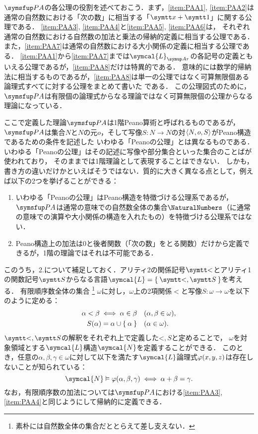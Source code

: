 \(\PA\)の各公理の役割を述べておこう．まず，\cref{item:PAA1}, \cref{item:PAA2}は通常の自然数における「次の数」に相当する「\(\obj{x} + \obj{1}\)」に関する公理である．
\cref{item:PAA3}, \cref{item:PAA4}と\cref{item:PAA5}, \cref{item:PAA6}は，
それぞれ通常の自然数における自然数の加法と乗法の帰納的定義に相当する公理である．
また，\cref{item:PAA7}は通常の自然数における大小関係の定義に相当する公理である．
\cref{item:PAA1}から\cref{item:PAA7}までは\(\symcal{L}_{\Ar}\)の各記号の定義ともいえる公理であるが，\cref{item:PAA8}だけは特異的である．
意味的には数学的帰納法に相当するものであるが，\cref{item:PAA8}は単一の公理ではなく可算無限個ある論理式すべてに対する公理をまとめて書いた%
%
である．
この公理図式のために，\(\PA\)は有限個の論理式からなる理論ではなく可算無限個の公理からなる理論になっている．

\begin{Note}
	ここで定義した理論\(\PA\)は1階Peano算術と呼ばれるものであるが，
	\(\PA\)は集合\(N\)と\(N\)の元\(o\)，そして写像\(S \colon N \to N\)の対\(\langle N, o, S \rangle\)がPeano構造であるための条件を記述した
	いわゆる「Peanoの公理」とは異なるものである．
	いわゆる「Peanoの公理」はその記述に写像や部分集合といった集合のことばが使われており，
	そのままでは1階理論として表現することはできない．
	しかも，書き方の違いだけかといえばそうではない．質的に大きく異なる点として，例えば以下の2つを挙げることができる：
	\begin{enumerate}
		\item いわゆる「Peanoの公理」はPeano構造を特徴づける公理系であるが，
		      \(\PA\)は通常の意味での自然数全体の集合\(\NaturalNumbers\)（に通常の意味での演算や大小関係の構造を入れたもの）を特徴づける公理系ではない．
		\item Peano構造上の加法は0と後者関数（「次の数」をとる関数）だけから定義できるが，1階の理論ではそれは不可能である．
	\end{enumerate}

	このうち，2.について補足しておく．アリティ2の関係記号\(\obj{<}\)とアリティ1の関数記号\(\obj{S}\)からなる言語\(\symcal{L} = \Set{\obj{<}, \obj{S}}\)を考える．
	有限順序数全体の集合%
	\footnote{%
		素朴には自然数全体の集合だととらえて差し支えない．%
	}%
	\(\omega\)に対し，\(\omega\)上の2項関係\(<\)と写像\(S \colon \omega \to \omega\)を以下のように定める：
	\begin{align*}
		\alpha < \beta \metaequivalent \alpha \in \beta \quad & (\alpha, \beta \in \omega), \\
		\apply{S}{\alpha} = \alpha \cup \Set{\alpha} \quad    & (\alpha \in \omega).
	\end{align*}
	\(\obj{<}, \obj{S}\)の解釈をそれぞれ上で定義した\(\mathord{<}, S\)と定めることで，
	\(\omega\)を対象領域とする\(\symcal{L}\)構造\(\symcal{N}\)を定義することができる．
	このとき，任意の\(\alpha, \beta, \gamma \in \omega\)に対して以下を満たす\(\symcal{L}\)論理式\(\apply{\varphi}{x, y, z}\)は存在しないことが知られている：
	\[
		\symcal{N} \satisfy \apply{\varphi}{\alpha, \beta, \gamma} \metaequivalent \alpha + \beta = \gamma.
	\]
	なお，有限順序数の加法については\(\PA\)における\cref{item:PAA3}, \cref{item:PAA4}と同じようにして帰納的に定義できる．
\end{Note}

